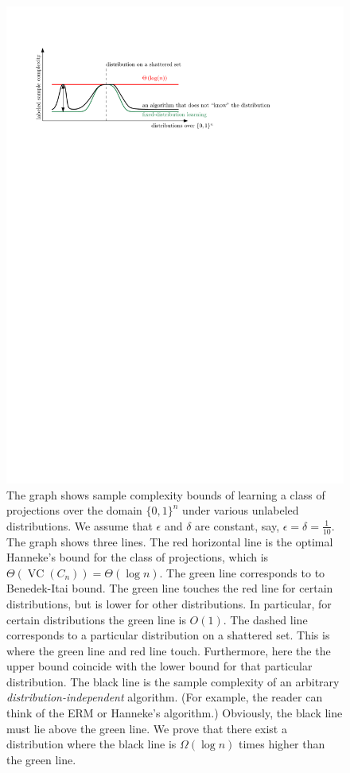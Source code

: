 \documentclass[10pt]{article}
\DeclareMathOperator{\VC}{VC}
\begin{document}
\begin{figure}
\centering
\includegraphics{figure}
\caption{The graph shows sample complexity bounds of learning a class of
projections over the domain $\{0,1\}^n$ under various unlabeled distributions.
We assume that $\epsilon$ and $\delta$ are constant, say, $\epsilon = \delta =
\frac{1}{10}$. The graph shows three lines. The red horizontal line is the
optimal Hanneke's bound for the class of projections, which is $\Theta(\VC(C_n)) =
\Theta(\log n)$. The green line corresponds to to Benedek-Itai bound. The green
line touches the red line for certain distributions, but is lower for other
distributions. In particular, for certain distributions the green line is
$O(1)$. The dashed line corresponds to a particular distribution on a shattered
set. This is where the green line and red line touch. Furthermore, here the the
upper bound coincide with the lower bound for that particular distribution. The
black line is the sample complexity of an arbitrary
\emph{distribution-independent} algorithm. (For example, the reader can think of
the ERM or Hanneke's algorithm.) Obviously, the black line must lie above the
green line. We prove that there exist a distribution where the black line is
$\Omega(\log n)$ times higher than the green line.}
\label{figure:sample-complexity}
\end{figure}
\end{document}
